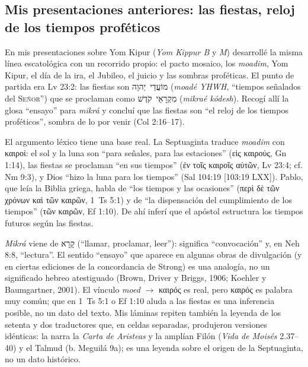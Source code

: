 \documentclass[11pt,letterpaper]{article}
\newcommand{\heb}[1]{\mbox{\foreignlanguage{hebrew}{#1}}}
\newcommand{\grc}[1]{\foreignlanguage{ancientgreek}{#1}}
\newcommand{\SENOR}{\textsc{Señor}}
\begin{document}
\subsection{Mis presentaciones anteriores: las fiestas, reloj de los tiempos proféticos}
En mis presentaciones sobre Yom Kipur (\emph{Yom Kippur B} y \emph{M}) desarrollé la misma línea escatológica con un recorrido propio: el pacto mosaico, los \emph{moadim}, Yom Kipur, el día de la ira, el Jubileo, el juicio y las sombras proféticas. El punto de partida era Lv 23:2: las fiestas son \heb{מוֹעֲדֵי יְהוָה} (\emph{moadé YHWH}, ``tiempos señalados del \SENOR'') que se proclaman como \heb{מִקְרָאֵי קֹדֶשׁ} (\emph{mikraé kódesh}). Recogí allí la glosa ``ensayo'' para \emph{mikrá} y concluí que las fiestas son ``el reloj de los tiempos proféticos'', sombra de lo por venir (Col 2:16--17).

El argumento léxico tiene una base real. La Septuaginta traduce \emph{moadim} con \grc{καιροί}: el sol y la luna son ``para señales, para las estaciones'' (\grc{εἰς καιρούς}, Gn 1:14), las fiestas se proclaman ``en sus tiempos'' (\grc{ἐν τοῖς καιροῖς αὐτῶν}, Lv 23:4; cf. Nm 9:3), y Dios ``hizo la luna para los tiempos'' (Sal 104:19 [103:19 LXX]). Pablo, que leía la Biblia griega, habla de ``los tiempos y las ocasiones'' (\grc{περὶ δὲ τῶν χρόνων καὶ τῶν καιρῶν}, 1~Ts 5:1) y de ``la dispensación del cumplimiento de los tiempos'' (\grc{τῶν καιρῶν}, Ef 1:10). De ahí inferí que el apóstol estructura los tiempos futuros según las fiestas.

\begin{nota}[Precisión]
\emph{Mikrá} viene de \heb{קָרָא} (``llamar, proclamar, leer''): significa ``convocación'' y, en Neh 8:8, ``lectura''. El sentido ``ensayo'' que aparece en algunas obras de divulgación (y en ciertas ediciones de la concordancia de Strong) es una analogía, no un significado hebreo atestiguado (Brown, Driver y Briggs, 1906; Koehler y Baumgartner, 2001). El vínculo \emph{moed} $\rightarrow$ \grc{καιρός} es real, pero \grc{καιρός} es palabra muy común; que en 1~Ts 5:1 o Ef 1:10 aluda a las fiestas es una inferencia posible, no un dato del texto. Mis láminas repiten también la leyenda de los setenta y dos traductores que, en celdas separadas, produjeron versiones idénticas: la narra la \emph{Carta de Aristeas} y la amplían Filón (\emph{Vida de Moisés} 2.37--40) y el Talmud (b. Meguilá 9a); es una leyenda sobre el origen de la Septuaginta, no un dato histórico.
\end{nota}
\end{document}
